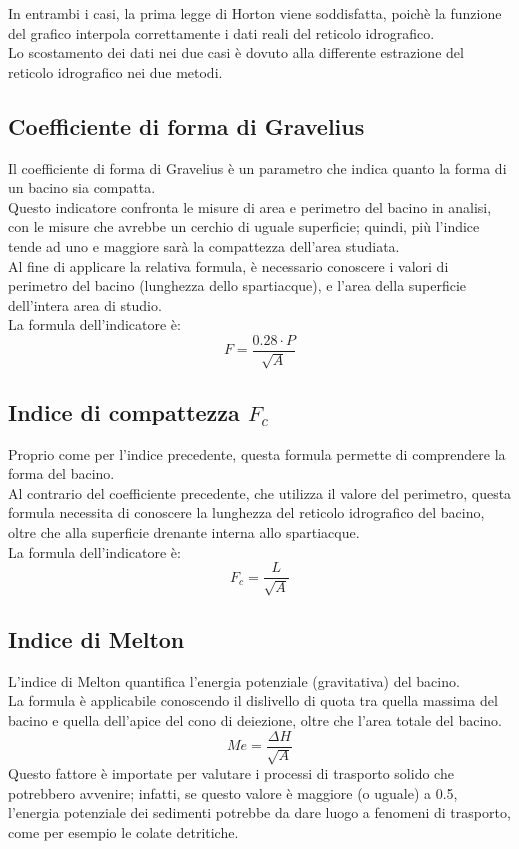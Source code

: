 \vspace{1cm}
In entrambi i casi, la prima legge di Horton viene soddisfatta, poichè la funzione del grafico interpola correttamente i dati reali del reticolo idrografico.\\
Lo scostamento dei dati nei due casi è dovuto alla differente estrazione del reticolo idrografico nei due metodi.

\subsection{Coefficiente di forma di Gravelius}
Il coefficiente di forma di Gravelius è un parametro che indica quanto la forma di un bacino sia compatta.\\
Questo indicatore confronta le misure di area e perimetro del bacino in analisi, con le misure che avrebbe un cerchio di uguale superficie; quindi, più l'indice tende ad uno e maggiore sarà la compattezza dell'area studiata.\\
Al fine di applicare la relativa formula, è necessario conoscere i valori di perimetro del bacino (lunghezza dello spartiacque), e l'area della superficie dell'intera area di studio.\\
La formula dell'indicatore è:
\begin{equation}
    F = \frac{0.28 \cdot P}{\sqrt{A}}
    \label{gravelius}
\end{equation}

\subsection{Indice di compattezza $F_c$}
Proprio come per l'indice precedente, questa formula permette di comprendere la forma del bacino.\\
Al contrario del coefficiente precedente, che utilizza il valore del perimetro, questa formula necessita di conoscere la lunghezza del reticolo idrografico del bacino, oltre che alla superficie drenante interna allo spartiacque.\\
La formula dell'indicatore è:
\begin{equation}
    F_c = \frac{L}{\sqrt{A}}
    \label{compatezza}
\end{equation}

\subsection{Indice di Melton}
L'indice di Melton quantifica l'energia potenziale (gravitativa) del bacino.\\
La formula è applicabile conoscendo il dislivello di quota tra quella massima del bacino e quella dell'apice del cono di deiezione, oltre che l'area totale del bacino. 
\begin{equation}
    Me = \frac{\Delta H}{\sqrt{A}}
    \label{melton}
\end{equation}
Questo fattore è importate per valutare i processi di trasporto solido che potrebbero avvenire; infatti, se questo valore è maggiore (o uguale) a 0.5, l'energia potenziale dei sedimenti potrebbe da dare luogo a fenomeni di trasporto, come per esempio le colate detritiche.

